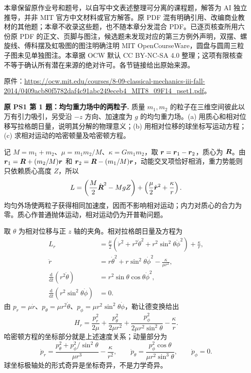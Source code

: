 本章保留原作业号和题号，以自写中文表述整理可分离的课程题，解答为 AI 独立推导，并非 MIT 官方中文材料或官方解答。原 PDF 混有明确引用、改编商业教材的其他题；本章不收录这些题，也不随本章分发混合 PDF。已逐页核查所用六份原 PDF 的正文、页脚与图注，候选题未发现对应的第三方例外声明，双摆、螺旋线、傅科摆及虹吸图的图注明确注明 MIT OpenCourseWare，圆盘与圆周三粒子图未见单独图注。本章据 OCW 默认 CC BY-NC-SA 4.0 整理；这项有限核查不等于确认所有潜在来源的绝对许可。各节链接给出原始来源。

原件：\url{https://ocw.mit.edu/courses/8-09-classical-mechanics-iii-fall-2014/0409acb80f5782daf4c91abc249eceb4_MIT8_09F14_pset1.pdf}。

\begin{example}
\textbf{原 PS1 第 1 题：均匀重力场中的两粒子.} 
质量 $m_1,m_2$ 的粒子在三维空间彼此以万有引力吸引，另受沿 $-z$ 方向、加速度为 $g$ 的均匀重力场。(a) 用质心和相对位移写拉格朗日量，说明其分解的物理意义；(b) 用相对位移的球坐标写运动方程；(c) 求相对运动的哈密顿量及哈密顿方程。
\end{example}
\begin{solution}
记 $M=m_1+m_2$、$\mu=m_1m_2/M$、$\kappa=Gm_1m_2$，取 $\boldsymbol{r}=\boldsymbol{r}_1-\boldsymbol{r}_2$，质心为 $\boldsymbol{R}$。由 $\boldsymbol{r}_1=\boldsymbol{R}+(m_2/M)\boldsymbol{r}$ 和 $\boldsymbol{r}_2=\boldsymbol{R}-(m_1/M)\boldsymbol{r}$，动能交叉项恰好相消，重力势能则只依赖质心高度 $Z$，所以
\[
 L=\left(\frac M2\dot{\boldsymbol{R}}^2-MgZ\right)
 +\left(\frac\mu2\dot{\boldsymbol{r}}^2+\frac\kappa r\right).
\]
均匀外场使两粒子获得相同加速度，因而不影响相对运动；内力对质心的合力为零。质心作普通抛体运动，相对运动仍为开普勒问题。

取 $\theta$ 为相对位移与正 $z$ 轴的夹角。相对拉格朗日量及方程为
\begin{align*}
 L_r&=\frac\mu2(\dot r^2+r^2\dot\theta^2+r^2\sin^2\theta\dot\phi^2)+\frac\kappa r,\\
 \ddot r&=r\dot\theta^2+r\sin^2\theta\dot\phi^2-\frac\kappa{\mu r^2},\\
 \frac{\mathrm d}{\mathrm dt}(r^2\dot\theta)&=r^2\sin\theta\cos\theta\dot\phi^2,\\
 \frac{\mathrm d}{\mathrm dt}(r^2\sin^2\theta\dot\phi)&=0.
\end{align*}
由 $p_r=\mu\dot r$、$p_\theta=\mu r^2\dot\theta$、$p_\phi=\mu r^2\sin^2\theta\dot\phi$，勒让德变换给出
\[
 H_r=\frac{p_r^2}{2\mu}+\frac{p_\theta^2}{2\mu r^2}
 +\frac{p_\phi^2}{2\mu r^2\sin^2\theta}-\frac\kappa r.
\]
哈密顿方程的坐标部分就是上述速度关系；动量部分为
\[
 \dot p_r=\frac{p_\theta^2+p_\phi^2/\sin^2\theta}{\mu r^3}-\frac\kappa{r^2},\qquad
 \dot p_\theta=\frac{p_\phi^2\cos\theta}{\mu r^2\sin^3\theta},\qquad \dot p_\phi=0.
\]
球坐标极轴处的形式奇异是坐标奇异，不是力学奇异。
\end{solution}

